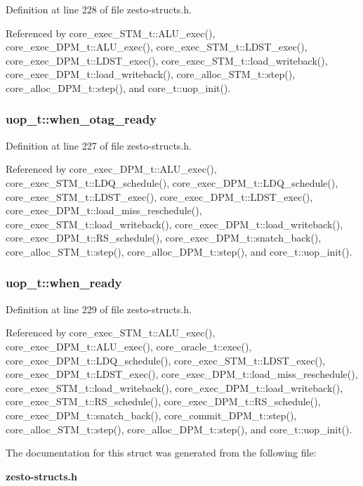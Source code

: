 Definition at line 228 of file zesto-structs.h.

Referenced by core\_\-exec\_\-STM\_\-t::ALU\_\-exec(), core\_\-exec\_\-DPM\_\-t::ALU\_\-exec(), core\_\-exec\_\-STM\_\-t::LDST\_\-exec(), core\_\-exec\_\-DPM\_\-t::LDST\_\-exec(), core\_\-exec\_\-STM\_\-t::load\_\-writeback(), core\_\-exec\_\-DPM\_\-t::load\_\-writeback(), core\_\-alloc\_\-STM\_\-t::step(), core\_\-alloc\_\-DPM\_\-t::step(), and core\_\-t::uop\_\-init().
\subsubsection[{when\_\-otag\_\-ready}]{ {\bf uop\_\-t::when\_\-otag\_\-ready}}\label{structuop__t_d0a96abdf3806e586b22c423791ca65b}




Definition at line 227 of file zesto-structs.h.

Referenced by core\_\-exec\_\-DPM\_\-t::ALU\_\-exec(), core\_\-exec\_\-STM\_\-t::LDQ\_\-schedule(), core\_\-exec\_\-DPM\_\-t::LDQ\_\-schedule(), core\_\-exec\_\-STM\_\-t::LDST\_\-exec(), core\_\-exec\_\-DPM\_\-t::LDST\_\-exec(), core\_\-exec\_\-DPM\_\-t::load\_\-miss\_\-reschedule(), core\_\-exec\_\-STM\_\-t::load\_\-writeback(), core\_\-exec\_\-DPM\_\-t::load\_\-writeback(), core\_\-exec\_\-DPM\_\-t::RS\_\-schedule(), core\_\-exec\_\-DPM\_\-t::snatch\_\-back(), core\_\-alloc\_\-STM\_\-t::step(), core\_\-alloc\_\-DPM\_\-t::step(), and core\_\-t::uop\_\-init().
\subsubsection[{when\_\-ready}]{ {\bf uop\_\-t::when\_\-ready}}\label{structuop__t_0d34db19472056540aed52be61665241}




Definition at line 229 of file zesto-structs.h.

Referenced by core\_\-exec\_\-STM\_\-t::ALU\_\-exec(), core\_\-exec\_\-DPM\_\-t::ALU\_\-exec(), core\_\-oracle\_\-t::exec(), core\_\-exec\_\-DPM\_\-t::LDQ\_\-schedule(), core\_\-exec\_\-STM\_\-t::LDST\_\-exec(), core\_\-exec\_\-DPM\_\-t::LDST\_\-exec(), core\_\-exec\_\-DPM\_\-t::load\_\-miss\_\-reschedule(), core\_\-exec\_\-STM\_\-t::load\_\-writeback(), core\_\-exec\_\-DPM\_\-t::load\_\-writeback(), core\_\-exec\_\-STM\_\-t::RS\_\-schedule(), core\_\-exec\_\-DPM\_\-t::RS\_\-schedule(), core\_\-exec\_\-DPM\_\-t::snatch\_\-back(), core\_\-commit\_\-DPM\_\-t::step(), core\_\-alloc\_\-STM\_\-t::step(), core\_\-alloc\_\-DPM\_\-t::step(), and core\_\-t::uop\_\-init().

The documentation for this struct was generated from the following file:\begin{CompactItemize}
\item 
{\bf zesto-structs.h}\end{CompactItemize}
